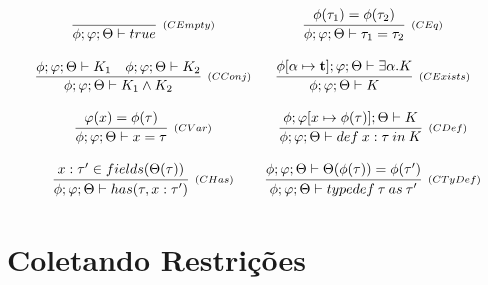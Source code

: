 \documentclass[a4paper,8pt]{article}
\begin{document}
     \[
          \begin{array}{cc}
      \infer[_{(CEmpty)}]{\phi ; \varphi ; \Theta \vdash true}{} & 
      \infer[_{(CEq)}]{\phi ; \varphi ; \Theta \vdash \tau_1 =
                                                                   \tau_2}{\phi(\tau_1)
                                                                   =
                                                                   \phi(\tau_2)}\\
        \\ 
       \infer[_{(CConj)}]{\phi ; \varphi ; \Theta \vdash K_1 \land K_2}
                            {\phi ; \varphi ; \Theta \vdash K_1 & 
                             \phi ; \varphi ; \Theta \vdash K_2 } &
        \infer[_{(CExists)}]{\phi ; \varphi ; \Theta \vdash K}
                                {\phi [\alpha \mapsto \textbf{t}] ; \varphi ; \Theta \vdash
                                                                    \exists
                                                                    \alpha
                                                                    . K
                                                                    }
            \\                                 
\\

\infer[_{(CVar)}]{\phi ; \varphi ; \Theta \vdash x = \tau}
                     {\varphi(x) = \phi(\tau) } &
\infer[_{(CDef)}]{\phi ; \varphi ; \Theta \vdash def\:x : \tau\:in\:
                                                  K}
                      {\phi ; \varphi [x \mapsto \phi(\tau) ]; \Theta
                                                  \vdash K} \\
\\
\infer[_{(CHas)}]{\phi ; \varphi ; \Theta \vdash has(\tau, x : \tau')}
                      {x : \tau'  \in fields(\Theta(\tau))} &
\infer[_{(CTyDef)}]{\phi ; \varphi ; \Theta \vdash typedef\: \tau\: as\:
                                                              \tau'}
                        {\phi ; \varphi ; \Theta \vdash \Theta(\phi(\tau)) =
                                                              \phi(\tau')}                                      
                                               
            
          \end{array}
     \]

      
     \section{Coletando Restrições}\label{constrcollect}
\end{document}
